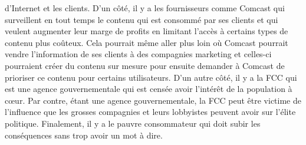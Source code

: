 \documentclass[12pt]{article}
\begin{document}
d’Internet et les clients. D’un côté, il y a les fournisseurs comme Comcast qui surveillent en tout temps le contenu qui est consommé par ses clients et qui veulent augmenter leur marge de profits en limitant l’accès à certains types de contenu plus coûteux. Cela pourrait même aller plus loin où Comcast pourrait vendre l’information de ses clients à des compagnies marketing et celles-ci pourraient créer du contenu sur mesure pour ensuite demander à Comcast de prioriser ce contenu pour certains utilisateurs. D’un autre côté, il y a la FCC qui est une agence gouvernementale qui est censée avoir l’intérêt de la population à cœur. Par contre, étant une agence gouvernementale, la FCC peut être victime de l’influence que les grosses compagnies et leurs lobbyistes peuvent avoir sur l’élite politique. Finalement, il y a le pauvre consommateur qui doit subir les conséquences sans trop avoir un mot à dire.
\end{document}
